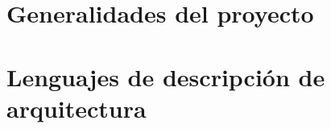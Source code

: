 \documentclass[12pt, oneside]{book}
\begin{document}
    
    

    

    

    \renewcommand{\contentsname}{\normalsize Contenido}
    \tableofcontents
    \newpage

    
    \mainmatter


    


    \chapter{Generalidades del proyecto}
    
    

    

    

    \chapter{Lenguajes de descripción de arquitectura}
    
    

    
    
    

    \newpage
    
    
\end{document}
